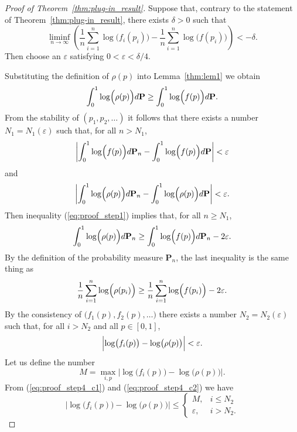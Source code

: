 \documentclass{article}
\theoremstyle{definition}
\begin{document}
\begin{proof}[Proof of Theorem~\ref{thm:plug-in_result}]
Suppose that,
contrary to the statement of Theorem~\ref{thm:plug-in_result},
there exists $\delta >0$ such that
\begin{equation}\label{eq:proof_contr1}
  \liminf_{n\rightarrow\infty}
  \left(
    \frac{1}{n} \sum_{i=1}^n\log\bigl(f_i(p_i)\bigr) -
    \frac{1}{n} \sum_{i=1}^n\log\bigl(f(p_i)\bigr)
  \right) < -\delta.
\end{equation}
Then choose an $\varepsilon$ satisfying $0<\varepsilon < \delta/4$.

Substituting the definition of $\rho(p)$ into Lemma~\ref{thm:lem1} we obtain
\begin{equation}\label{eq:proof_step1}
\int_0^1 \log\Bigl(\rho(p)\Bigr)d\textbf{P} \geq \int_0^1 \log\Bigl(f(p)\Bigr)d\textbf{P}.
\end{equation}
From the stability of $(p_1, p_2, \ldots)$ it follows that
there exists a number $N_1 = N_1(\varepsilon)$ such that, for all $n > N_1$,
$$
  \left|
    \int_0^1 \log\Bigl(f(p)\Bigr)d\textbf{P}_n -
    \int_0^1 \log\Bigl(f(p)\Bigr)d\textbf{P}
  \right|
  <
  \varepsilon
$$
and
$$
  \left|
    \int_0^1 \log\Bigl(\rho(p)\Bigr)d\textbf{P}_n -
    \int_0^1 \log\Bigl(\rho(p)\Bigr)d\textbf{P}
  \right|
  <
  \varepsilon.
$$
Then inequality (\ref{eq:proof_step1}) implies that, for all $n \geq N_1$,
$$
\int_0^1 \log\Bigl(\rho(p)\Bigr)d\textbf{P}_n \geq
\int_0^1 \log\Bigl(f(p)\Bigr)d\textbf{P}_n - 2\varepsilon.
$$
By the definition of the probability measure $\textbf{P}_n$,
the last inequality is the same thing as
\begin{equation}\label{eq:proof_step3}
  \frac{1}{n}\sum_{i=1}^n \log\Bigl(\rho(p_i)\Bigr) \geq
  \frac{1}{n}\sum_{i=1}^n \log\Bigl(f(p_i)\Bigr) - 2\varepsilon.
\end{equation}
By the consistency of $\bigl(f_1(p), f_2(p),\ldots\bigr)$
there exists a number $N_2= N_2(\varepsilon)$ such that,
for all $i > N_2$ and all $p\in[0,1]$,
\begin{equation}
\label{eq:proof_step4_c1}
\Bigl| \log \bigl( f_i(p) \bigr) - \log \bigl( \rho(p) \bigr) \Bigr| <
\varepsilon.
\end{equation}
Let us define the number
\begin{equation}
\label{eq:proof_step4_c2}
M = \displaystyle\max_{i,p}
\bigl| \log \bigl( f_i(p) \bigr) - \log \bigl( \rho(p) \bigr)\bigr|.
\end{equation}
From (\ref{eq:proof_step4_c1}) and (\ref{eq:proof_step4_c2}) we have
\begin{equation}
\label{eq:proof_step4_c3}
\bigl| \log \bigl( f_i(p) \bigr) - \log \bigl( \rho(p) \bigr)\bigr| \leq
\left\{
 \begin{array}{ll}
   M,& i \leq N_2\\
   \varepsilon,& i > N_2.
 \end{array}
\right.
\end{equation}


\end{proof}
\end{document}
